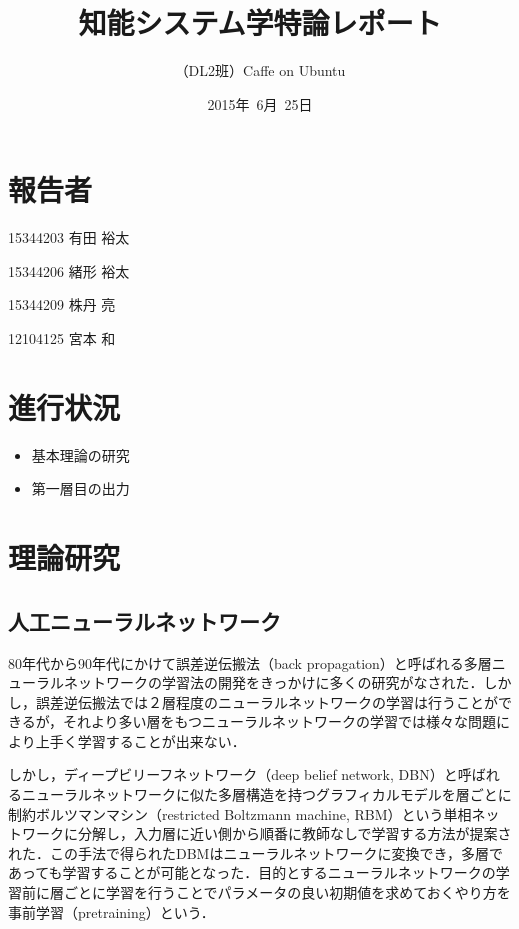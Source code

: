 \documentclass[a4paper,10pt]{jsarticle}
\title{知能システム学特論レポート}
\author{
（DL2班）Caffe on Ubuntu\\
}
\date{2015年\ 6月\ 25日}
\begin{document}
\maketitle
\section{報告者}
\begin{list}{}{}
 \item 15344203\hspace{0.5cm} 有田 裕太
 \item 15344206\hspace{0.5cm} 緒形 裕太
 \item 15344209\hspace{0.5cm} 株丹 亮
 \item 12104125\hspace{0.5cm} 宮本 和
\end{list}

\section{進行状況}
\begin{itemize}
\item 基本理論の研究
\item 第一層目の出力
\end{itemize}

\section{理論研究}

\subsection{人工ニューラルネットワーク}
80年代から90年代にかけて誤差逆伝搬法（back propagation）と呼ばれる多層ニューラルネットワークの学習法の開発をきっかけに多くの研究がなされた．しかし，誤差逆伝搬法では２層程度のニューラルネットワークの学習は行うことができるが，それより多い層をもつニューラルネットワークの学習では様々な問題により上手く学習することが出来ない．

しかし，ディープビリーフネットワーク（deep belief network, DBN）と呼ばれるニューラルネットワークに似た多層構造を持つグラフィカルモデルを層ごとに制約ボルツマンマシン（restricted Boltzmann machine, RBM）という単相ネットワークに分解し，入力層に近い側から順番に教師なしで学習する方法が提案された．この手法で得られたDBMはニューラルネットワークに変換でき，多層であっても学習することが可能となった．目的とするニューラルネットワークの学習前に層ごとに学習を行うことでパラメータの良い初期値を求めておくやり方を事前学習（pretraining）という．
\end{document}
